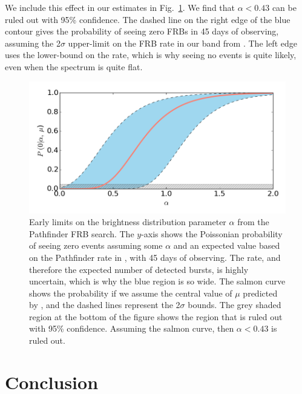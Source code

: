 We include this effect in our estimates in Fig.~\ref{fig-pf_alpha}. 
We find that $\alpha < 0.43$
can be ruled out with 95\% confidence.
The dashed line on the right edge of the blue 
contour gives the probability of seeing 
zero FRBs in 45 days of observing, assuming the 
2$\sigma$ upper-limit on the FRB rate in our band
from \citep{2016MNRAS.460.1054C}. The 
left edge uses the lower-bound on the rate, which is why 
seeing no events is quite likely, even when the 
spectrum is quite flat.

\begin{figure}[!h]
\begin{center}
\includegraphics[trim={0in 0in 0in 0in}, scale=0.65]
{./figures/beamforming/alpha_limits.png}
\vspace{-.4cm}
\caption[abc]{Early limits on the brightness distribution 
     parameter $\alpha$ from the Pathfinder 
     FRB search. The $y$-axis shows the Poissonian 
     probability of seeing zero events assuming 
     some $\alpha$ and an expected value based on the 
     Pathfinder rate in \citet{2016MNRAS.460.1054C}, 
     with 45 days of observing. The rate, and therefore the 
     expected number of detected bursts, is highly uncertain,
     which is why the blue region is so wide.
     The salmon curve shows the probability if we assume the 
     central value of $\mu$ predicted by \citet{2016MNRAS.460.1054C}, 
     and the dashed lines represent 
     the 2$\sigma$ bounds. The grey shaded region at the bottom 
     of the figure shows the region that is ruled out 
     with 95\% confidence. Assuming the salmon curve, 
     then $\alpha < 0.43$ is ruled out.}
\label{fig-pf_alpha}
\end{center}
\end{figure}

\section{Conclusion}
\label{sec:beamforming_conclusion}

